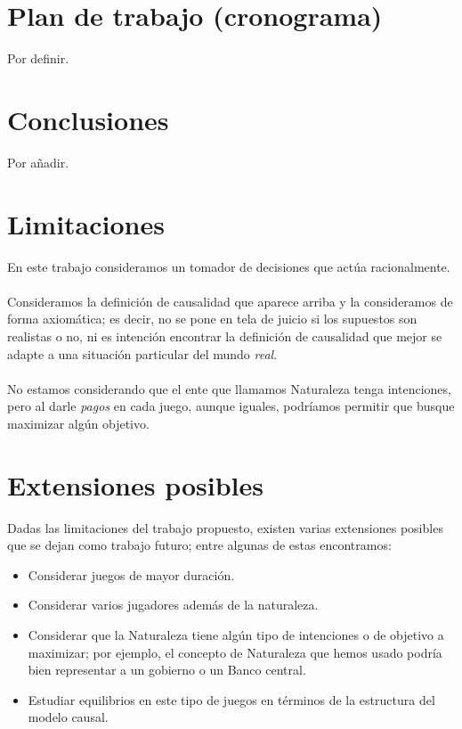 \documentclass[11pt]{article}
\theoremstyle{plain}
\begin{document}
\section{Plan de trabajo (cronograma)}
Por definir.
\section{Conclusiones}
Por añadir.
\section{Limitaciones}
En este trabajo consideramos un tomador de decisiones que actúa racionalmente.\\
\\
Consideramos la definición de causalidad que aparece arriba y la consideramos de forma axiomática; es decir, no se pone en tela de juicio si los supuestos son realistas o no, ni es intención encontrar la definición de causalidad que mejor se adapte a una situación particular del mundo \textit{real}.\\
\\
No estamos considerando que el ente que llamamos Naturaleza tenga intenciones, pero al darle \textit{pagos} en cada juego, aunque iguales, podríamos permitir que busque maximizar algún objetivo.

\section{Extensiones posibles}
Dadas las limitaciones del trabajo propuesto, existen varias extensiones posibles que se dejan como trabajo futuro; entre algunas de estas encontramos:
\begin{itemize}
\item Considerar juegos de mayor duración.
\item Considerar varios jugadores además de la naturaleza.
\item Considerar que la Naturaleza tiene algún tipo de intenciones o de objetivo a maximizar; por ejemplo, el concepto de Naturaleza que hemos usado podría bien representar a un gobierno o un Banco central.
\item Estudiar equilibrios en este tipo de juegos en términos de la estructura del modelo causal. 
\end{itemize}



\end{document}
